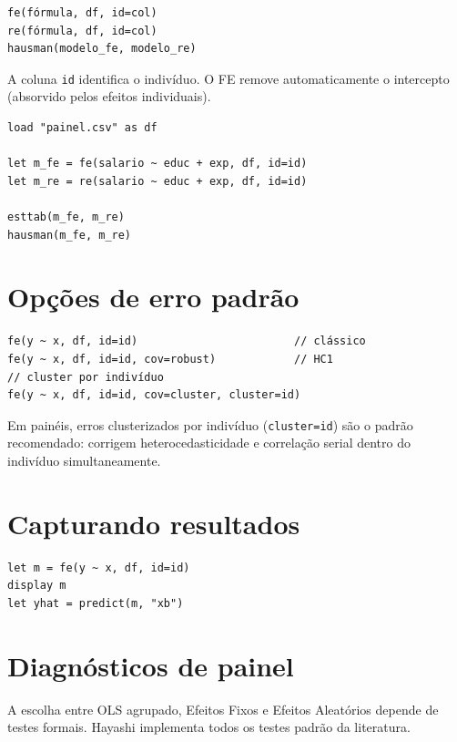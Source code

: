 \begin{lstlisting}
fe(fórmula, df, id=col)
re(fórmula, df, id=col)
hausman(modelo_fe, modelo_re)
\end{lstlisting}

A coluna \lstinline{id} identifica o indivíduo. O FE remove automaticamente
o intercepto (absorvido pelos efeitos individuais).

\begin{lstlisting}[caption={Fluxo completo}]
load "painel.csv" as df

let m_fe = fe(salario ~ educ + exp, df, id=id)
let m_re = re(salario ~ educ + exp, df, id=id)

esttab(m_fe, m_re)
hausman(m_fe, m_re)
\end{lstlisting}

\section{Opções de erro padrão}

\begin{lstlisting}
fe(y ~ x, df, id=id)                        // clássico
fe(y ~ x, df, id=id, cov=robust)            // HC1
// cluster por indivíduo
fe(y ~ x, df, id=id, cov=cluster, cluster=id)
\end{lstlisting}

\begin{nota}
  Em painéis, erros clusterizados por indivíduo (\lstinline{cluster=id})
  são o padrão recomendado: corrigem heterocedasticidade e correlação serial
  dentro do indivíduo simultaneamente.
\end{nota}

\section{Capturando resultados}

\begin{lstlisting}
let m = fe(y ~ x, df, id=id)
display m
let yhat = predict(m, "xb")
\end{lstlisting}

\section{Diagnósticos de painel}

A escolha entre OLS agrupado, Efeitos Fixos e Efeitos Aleatórios depende de
testes formais. Hayashi implementa todos os testes padrão da literatura.

